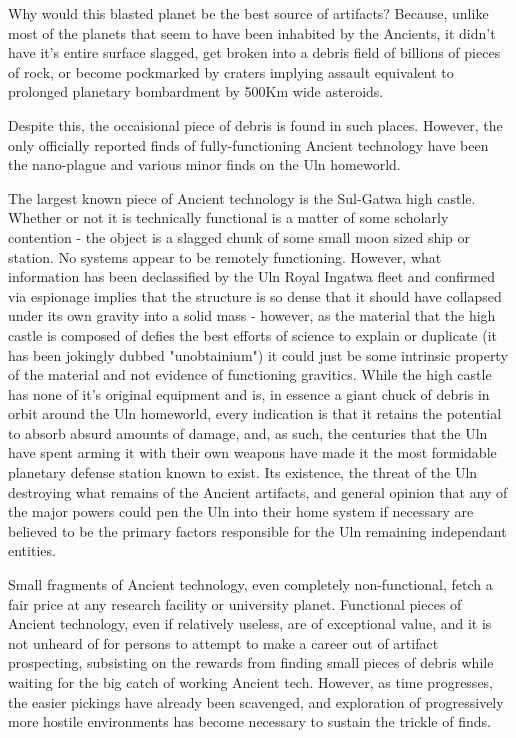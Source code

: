 Why would this blasted planet be the best source of artifacts?
Because, unlike most of the planets that seem to have been inhabited
by the Ancients, it didn't have it's entire surface slagged, get
broken into a debris field of billions of pieces of rock, or become
pockmarked by craters implying assault equivalent to prolonged
planetary bombardment by 500Km wide asteroids.

Despite this, the occaisional piece of debris is found in such
places. However, the only officially reported finds of
fully-functioning Ancient technology have been the nano-plague and
various minor finds on the Uln homeworld.

The largest known piece of Ancient technology is the Sul-Gatwa high
castle. Whether or not it is technically functional is a matter of
some scholarly contention - the object is a slagged chunk of some
small moon sized ship or station. No systems appear to be remotely
functioning. However, what information has been declassified by the
Uln Royal Ingatwa fleet and confirmed via espionage implies that the
structure is so dense that it should have collapsed under its own
gravity into a solid mass - however, as the material that the high
castle is composed of defies the best efforts of science to explain or
duplicate (it has been jokingly dubbed "unobtainium") it could just be
some intrinsic property of the material and not evidence of
functioning gravitics. While the high castle has none of it's original
equipment and is, in essence a giant chuck of debris in orbit around
the Uln homeworld, every indication is that it retains the potential
to absorb absurd amounts of damage, and, as such, the centuries that
the Uln have spent arming it with their own weapons have made it the
most formidable planetary defense station known to exist. Its
existence, the threat of the Uln destroying what remains of the
Ancient artifacts, and general opinion that any of the major powers
could pen the Uln into their home system if necessary are believed to
be the primary factors responsible for the Uln remaining independant
entities.

Small fragments of Ancient technology, even completely non-functional,
fetch a fair price at any research facility or university
planet. Functional pieces of Ancient technology, even if relatively
useless, are of exceptional value, and it is not unheard of for
persons to attempt to make a career out of artifact prospecting,
subsisting on the rewards from finding small pieces of debris while
waiting for the big catch of working Ancient tech. However, as time
progresses, the easier pickings have already been scavenged, and
exploration of progressively more hostile environments has become
necessary to sustain the trickle of finds.

